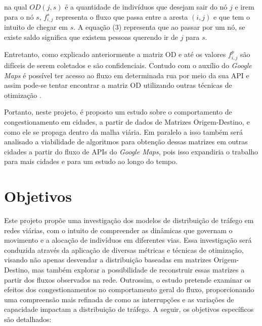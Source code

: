 \documentclass{article}
\begin{document}
na qual $OD(j,s)$ é a quantidade de indivíduos que desejam sair do nó $j$ e irem para o nó $s$, $f^s_{i,j}$ representa o fluxo que passa entre a aresta $(i,j)$ e que tem o intuito de chegar em $s$. A equação (3) representa que ao passar por um nó, se existe saldo significa que existem pessoas querendo ir de $j$ para $s$.

Entretanto, como explicado anteriormente a matriz OD e até os valores $f^p_{i,j}$ são difíceis de serem coletados e são confidenciais. Contudo com o auxílio do \textit{Google Maps} é possível ter acesso ao fluxo em determinada rua por meio da sua API e assim pode-se tentar encontrar a matriz OD utilizando outras técnicas de otimização \cite{spiess1990gradient,turnquist1979estimation,spiess1987maximum}.

Portanto, neste projeto, é proposto um estudo sobre o comportamento de congestionamento em cidades, a partir de dados de Matrizes Origem-Destino, e como ele se propaga dentro da malha viária. Em paralelo a isso também será analisado a viabilidade de algoritmos para obtenção dessas matrizes em outras cidades a partir do fluxo de APIs do \textit{Google Maps}, pois isso expandiria o trabalho para mais cidades e para um estudo ao longo do tempo.


\newpage
\section{Objetivos}

Este projeto propõe uma investigação dos modelos de distribuição de tráfego em redes viárias, com o intuito de compreender as dinâmicas que governam o movimento e a alocação de indivíduos em diferentes vias. Essa investigação será conduzida através da aplicação de diversas métricas e técnicas de otimização, visando não apenas desvendar a distribuição baseadas em matrizes Origem-Destino, mas também explorar a possibilidade de reconstruir essas matrizes a partir dos fluxos observados na rede. Outrossim, o estudo pretende examinar os efeitos dos congestionamentos no comportamento geral do fluxo, proporcionando uma compreensão mais refinada de como as interrupções e as variações de capacidade impactam a distribuição de tráfego. A seguir, os objetivos específicos são detalhados:
\end{document}
